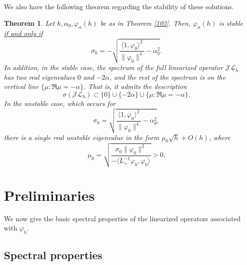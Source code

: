 \documentclass[12pt]{amsart}
\newtheorem{theorem}{Theorem}
\theoremstyle{definition}
\theoremstyle{remark}
\numberwithin{equation}{section}
\renewcommand{\(}{\left(}
\renewcommand{\)}{\right)}
\renewcommand{\[}{\left[}
\renewcommand{\]}{\right]}
\newcommand{\f}[2]{\frac{#1}{#2}}
\newcommand{\cl}{{\mathcal L}}
\newcommand{\al}{\alpha}
\newcommand{\si}{\sigma}
\newcommand{\vp}{\varphi}
\newcommand{\dpr}[2]{\langle #1,#2 \rangle}
\newcommand{\cj}{{\mathcal J}}
\begin{document}
  We also have the following theorem regarding the stability of these solutions.
  \begin{theorem}
  	\label{105}
  	Let  $h, \al_0, \vp_{\al}(h)$ be as in Theorem \ref{102}. Then, $\vp_{\al}(h)$ is stable \underline{if and only if}
  	$$
  \si_0= - \sqrt{ \f{\dpr{1}{\vp_0}^2}{\|\vp_0\|^4}-\al_0^2}.
  	$$
  	In addition, in the stable case, the spectrum of the full linearized operator $\cj \cl_h$ has two real eigenvalues $0$ and $-2\al$, and the rest of the spectrum is on the vertical line $\{\mu: \Re\mu=-\al \}$.  That is, it
  	admits the description
  	$$
  	\si(\cj \cl_h)\subset  \{0\} \cup\{-2\al\}\cup  \{\mu: \Re\mu=-\al \}.
  	$$
  	In the unstable case, which occurs for $$  \si_0=  \sqrt{ \f{\dpr{1}{\vp_0}^2}{\|\vp_0\|^4}-\al_0^2},$$  there is a single real
  	unstable  eigenvalue in the form $\mu_0 \sqrt{h}+O(h)$, where
  	$$
  	\mu_0=\sqrt{\f{\si_0 \|\vp_0\|^2}{-\dpr{L_{+}^{-1}\vp_0}{\vp_0}}}>0.
  	$$
  		
  \end{theorem}


\section{Preliminaries}





 We  now give  the  basic spectral properties of the linearized operators associated with $\vp_h$.







 \subsection{Spectral properties}
\end{document}
